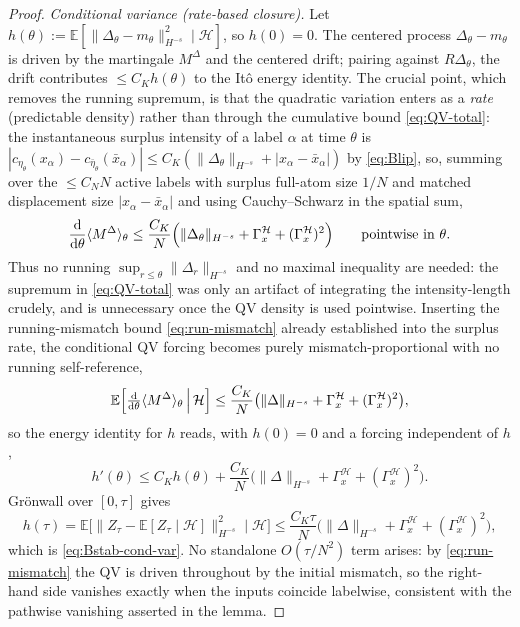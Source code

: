 \documentclass[a4paper,fleqn]{cas-sc}
\theoremstyle{definition}
\theoremstyle{remark}
\begin{document}
\begin{proof}
\emph{Conditional variance (rate-based closure).} Let
$h(\theta):=\mathbb E[\|\Delta_\theta-m_\theta\|_{H^{-s}}^2\mid\mathcal H]$, so
$h(0)=0$. The centered process
$\Delta_\theta-m_\theta$ is driven by the martingale $M^\Delta$ and the centered
drift; pairing against $R\Delta_\theta$, the drift contributes $\le C_Kh(\theta)$ to
the It\^o energy identity. The crucial point, which removes the running supremum,
is that the quadratic variation enters as a \emph{rate} (predictable density) rather
than through the cumulative bound \eqref{eq:QV-total}: the instantaneous surplus
intensity of a label $\alpha$ at time $\theta$ is
$|c_{\eta_\theta}(x_\alpha)-c_{\bar\eta_\theta}(\bar x_\alpha)|
\le C_K(\|\Delta_\theta\|_{H^{-s}}+|x_\alpha-\bar x_\alpha|)$ by \eqref{eq:Blip}, so,
summing over the $\le C_NN$ active labels with surplus full-atom size $1/N$ and
matched displacement size $|x_\alpha-\bar x_\alpha|$ and using Cauchy--Schwarz in
the spatial sum,
\[
\frac{\mathrm d}{\mathrm d\theta}\langle M^\Delta\rangle_\theta
\le\frac{C_K}{N}\Bigl(\|\Delta_\theta\|_{H^{-s}}+\Gamma_x^{\mathcal H}+(\Gamma_x^{\mathcal H})^2\Bigr)
\qquad\text{pointwise in }\theta.
\]
Thus no running $\sup_{r\le\theta}\|\Delta_r\|_{H^{-s}}$ and no maximal inequality are
needed: the supremum in \eqref{eq:QV-total} was only an artifact of integrating the
intensity-length crudely, and is unnecessary once the QV density is used pointwise.
Inserting the running-mismatch bound \eqref{eq:run-mismatch} already established into
the surplus rate, the conditional QV forcing becomes purely mismatch-proportional
with no running self-reference,
\[
\mathbb E\Bigl[\tfrac{\mathrm d}{\mathrm d\theta}\langle M^\Delta\rangle_\theta\,\Big|\,\mathcal H\Bigr]
\le\frac{C_K}{N}\bigl(\|\Delta\|_{H^{-s}}+\Gamma_x^{\mathcal H}+(\Gamma_x^{\mathcal H})^2\bigr),
\]
so the energy identity for $h$ reads, with $h(0)=0$ and a forcing independent of $h$,
\[
h'(\theta)\le C_Kh(\theta)+\frac{C_K}{N}\bigl(\|\Delta\|_{H^{-s}}+\Gamma_x^{\mathcal H}+(\Gamma_x^{\mathcal H})^2\bigr).
\]
Gr\"onwall over $[0,\tau]$ gives
\[
h(\tau)=\mathbb E\bigl[\|Z_\tau-\mathbb E[Z_\tau\mid\mathcal H]\|_{H^{-s}}^2\mid\mathcal H\bigr]
\le\frac{C_K\tau}{N}\bigl(\|\Delta\|_{H^{-s}}+\Gamma_x^{\mathcal H}+(\Gamma_x^{\mathcal H})^2\bigr),
\]
which is \eqref{eq:Bstab-cond-var}. No standalone $O(\tau/N^2)$ term arises: by
\eqref{eq:run-mismatch} the QV is driven throughout by the initial mismatch, so the
right-hand side vanishes exactly when the inputs coincide labelwise, consistent with
the pathwise vanishing asserted in the lemma.


\end{proof}
\end{document}
